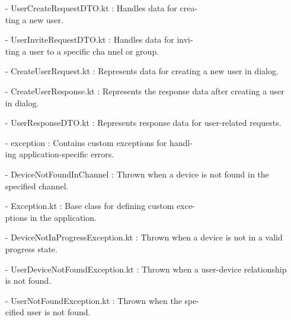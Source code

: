 \documentclass[conference]{IEEEtran}
\begin{document}
\begin{enumerate}
        \item[-] UserCreateRequestDTO.kt : Handles data for crea-\\ting a new user.\\
        \item[-] UserInviteRequestDTO.kt : Handles data for invi-\\ting a user to a specific cha
        nnel or group.\\
        \item[-] CreateUserRequest.kt : Represents data for creating a new user in dialog.\\
        \item[-] CreateUserResponse.kt : Represents the response data after creating a user in dialog.\\
        \item[-] UserResponseDTO.kt : Represents response data for user-related requests.\\
        
        \item[-] exception : Contains custom exceptions for handl-\\ing application-specific errors.\\
        \item[-] DeviceNotFoundInChannel : Thrown when a device is not found in the specified channel. \\
        \item[-] Exception.kt : Base class for defining custom exce-\\ptions in the application.\\
        \item[-] DeviceNotInProgressException.kt : Thrown when a device is not in a valid progress state.\\
        \item[-] UserDeviceNotFoundException.kt : Thrown when a user-device relationship is not found. \\
        \item[-] UserNotFoundException.kt : Thrown when the spe-\\cified user is not found.\\


\end{enumerate}
\end{document}
